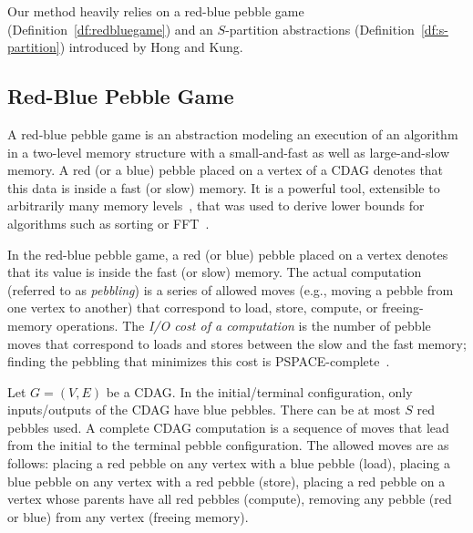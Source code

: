 Our method heavily relies on a red-blue pebble game 
(Definition~\ref{df:redbluegame}) 
and an $S$-partition abstractions (Definition~\ref{df:s-partition}) introduced 
by Hong and Kung.

\subsection{Red-Blue Pebble Game}
A red-blue pebble game is an abstraction modeling an execution of an algorithm 
in a two-level memory structure with a 
small-and-fast
as well as large-and-slow memory. A red (or a blue) pebble placed on a vertex 
of a CDAG denotes that this data is inside a fast (or slow) memory.  It is a 
powerful tool, extensible to
arbitrarily many memory levels~\cite{redblueHierarchy}, that was used to derive
lower bounds for algorithms such as sorting or FFT~\cite{redblue}. 

%
In the red-blue pebble game, a red (or blue) pebble placed on a vertex denotes 
that its value is inside the fast (or slow) memory.
%
%
The actual computation (referred to as
\emph{pebbling}) is a series of allowed moves (e.g., moving a pebble from one
vertex to another) that correspond to load, store, compute, or
freeing-memory operations.
%
The \emph{I/O cost of a computation} is the number of pebble moves that
correspond to loads and stores between the slow and the fast memory; finding 
the pebbling that minimizes
this cost is PSPACE-complete~\cite{redbluecomplete, pebblegameregister}. 

\begin{defn} \label{df:redbluegame}
	Let $G = (V,E)$ be a CDAG. 
	In the initial/terminal configuration, only inputs/outputs of the CDAG have
	blue pebbles.
	There can be at most $S$ red pebbles used. A complete CDAG computation is a
	sequence of moves that lead from the initial to the terminal pebble
	configuration.
	The allowed moves are as follows:  placing a red pebble on any 
	vertex
	with a blue pebble (load),  placing a blue pebble on any vertex 
	with 
	a red
	pebble (store),  placing a red pebble on a vertex whose parents 
	have 
	all red
	pebbles (compute),  removing any pebble (red or blue) from any 
	vertex 
	(freeing memory).
\end{defn}

